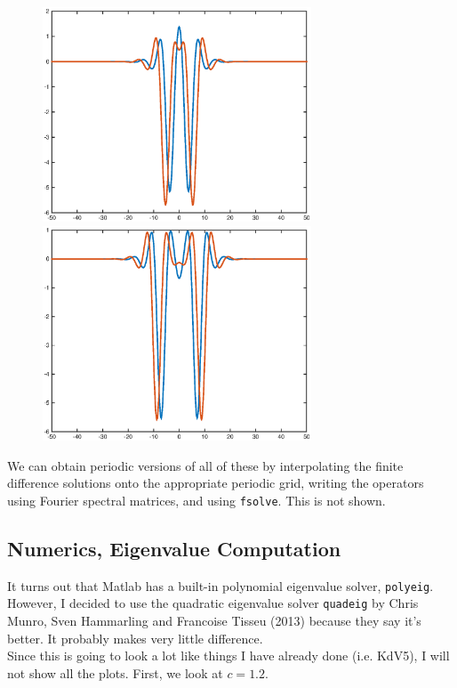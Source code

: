 \documentclass[12pt]{article}
\begin{document}
\begin{figure}[H]
\centering
\includegraphics[width=8cm]{double12_12.eps}
\includegraphics[width=8cm]{double12_34.eps}
\end{figure}

We can obtain periodic versions of all of these by interpolating the finite difference solutions onto the appropriate periodic grid, writing the operators using Fourier spectral matrices, and using \texttt{fsolve}. This is not shown.\\

\subsection{Numerics, Eigenvalue Computation}

It turns out that Matlab has a built-in polynomial eigenvalue solver, \texttt{polyeig}. However, I decided to use the quadratic eigenvalue solver \texttt{quadeig} by Chris Munro, Sven Hammarling and Francoise Tisseu (2013) because they say it's better. It probably makes very little difference.\\

Since this is going to look a lot like things I have already done (i.e. KdV5), I will not show all the plots. First, we look at $c = 1.2$.\\
\end{document}

